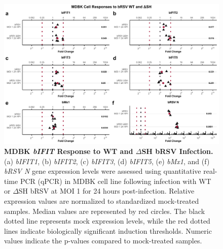 \begin{figure}
    \centering
    \includegraphics[width=1\linewidth]{07. Chapter 2/Figs/02. Induction/05. mdbk_brsv_moi1_dsh.pdf}
    \caption[MDBK \textit{bIFIT} Response to WT and \(\Delta\)SH bRSV Infection.]{\textbf{MDBK \textit{bIFIT} Response to WT and \(\Delta\)SH bRSV Infection.} (a) \textit{bIFIT1}, (b) \textit{bIFIT2}, (c) \textit{bIFIT3}, (d) \textit{bIFIT5}, (e) \textit{bMx1}, and (f) \textit{bRSV N} gene expression levels were assessed using quantitative real-time PCR (qPCR) in MDBK cell line following infection with WT or \(\Delta\)SH bRSV at MOI 1 for 24 hours post-infection. Relative expression values are normalized to standardized mock-treated samples. Median values are represented by red circles. The black dotted line represents mock expression levels, while the red dotted lines indicate biologically significant induction thresholds. Numeric values indicate the p-values compared to mock-treated samples.}
    \label{fig:MDBK responses to dSH}
\end{figure}

